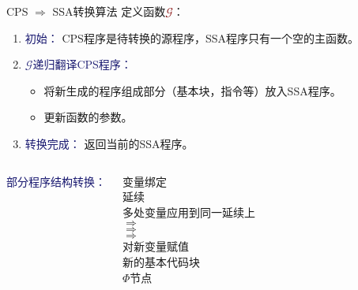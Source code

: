 \begin{frame}{CPS $\Rightarrow$ SSA转换算法}
  定义函数\textcolor{Maroon}{$\mathcal{G}$}：
  \begin{enumerate}
    \item \textcolor{MidnightBlue}{初始：} CPS程序是待转换的源程序，SSA程序只有一个空的主函数。
    \item \textcolor{MidnightBlue}{$\mathcal{G}$递归翻译CPS程序：}
    \begin{itemize}
        \item 将新生成的程序组成部分（基本块，指令等）放入SSA程序。
        \item 更新函数的参数。
    \end{itemize}
    \item \textcolor{MidnightBlue}{转换完成：} 返回当前的SSA程序。  
\end{enumerate}
\vspace{1ex}
\small
\begin{columns}[c]
  \textcolor{MidnightBlue}{部分程序结构转换：}
  \begin{column}{0.6\textwidth}
  \begin{columns}
    变量绑定 \\
    延续 \\
    多处变量应用到同一延续上 \\
    $\Rightarrow$ \\
    $\Rightarrow$ \\
    $\Rightarrow$ \\
    对新变量赋值 \\
    新的基本代码块 \\
    $\Phi$节点 \\
  \end{columns}
\end{column}
\end{columns}

\end{frame}


